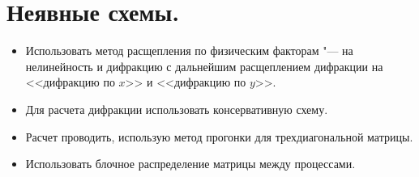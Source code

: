 \section{Неявные схемы.}

\begin{itemize}
	\item Использовать метод расщепления по физическим факторам "--- на 
	нелинейность и дифракцию с дальнейшим расщеплением дифракции на <<дифракцию по $x$>> и
	<<дифракцию по $y$>>.
	\item Для расчета дифракции использовать консервативную схему.
	\item Расчет проводить, использую метод прогонки для трехдиагональной матрицы.
	\item Использовать блочное распределение матрицы между процессами.
\end{itemize}

